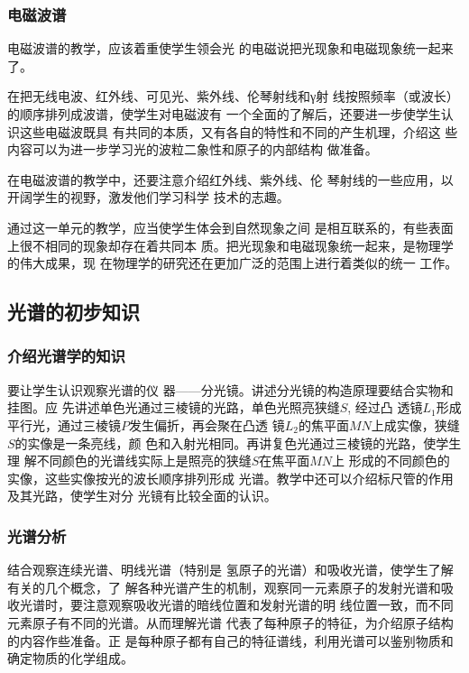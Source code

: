 \subsubsection{电磁波谱} 
电磁波谱的教学，应该着重使学生领会光
的电磁说把光现象和电磁现象统一起来了。

在把无线电波、红外线、可见光、紫外线、伦琴射线和γ射
线按照频率（或波长）的顺序排列成波谱，使学生对电磁波有
一个全面的了解后，还要进一步使学生认识这些电磁波既具
有共同的本质，又有各自的特性和不同的产生机理，介绍这
些内容可以为进一步学习光的波粒二象性和原子的内部结构
做准备。

在电磁波谱的教学中，还要注意介绍红外线、紫外线、伦
琴射线的一些应用，以开阔学生的视野，激发他们学习科学
技术的志趣。

通过这一单元的教学，应当使学生体会到自然现象之间
是相互联系的，有些表面上很不相同的现象却存在着共同本
质。把光现象和电磁现象统一起来，是物理学的伟大成果，现
在物理学的研究还在更加广泛的范围上进行着类似的统一
工作。

\subsection{光谱的初步知识}
\subsubsection{介绍光谱学的知识}

要让学生认识观察光谱的仪
器——分光镜。讲述分光镜的构造原理要结合实物和挂图。应
先讲述单色光通过三棱镜的光路，单色光照亮狭缝$S$, 经过凸
透镜$L_1$形成平行光，通过三棱镜$P$发生偏折，再会聚在凸透
镜$L_2$的焦平面$MN$上成实像，狭缝$S$的实像是一条亮线，颜
色和入射光相同。再讲复色光通过三棱镜的光路，使学生理
解不同颜色的光谱线实际上是照亮的狭缝$S$在焦平面$MN$上
形成的不同颜色的实像，这些实像按光的波长顺序排列形成
光谱。教学中还可以介绍标尺管的作用及其光路，使学生对分
光镜有比较全面的认识。

\subsubsection{光谱分析}

结合观察连续光谱、明线光谱（特别是
氢原子的光谱）和吸收光谱，使学生了解有关的几个概念，了
解各种光谱产生的机制，观察同一元素原子的发射光谱和吸
收光谱时，要注意观察吸收光谱的暗线位置和发射光谱的明
线位置一致，而不同元素原子有不同的光谱。从而理解光谱
代表了每种原子的特征，为介绍原子结构的内容作些准备。正
是每种原子都有自己的特征谱线，利用光谱可以鉴别物质和
确定物质的化学组成。

